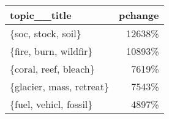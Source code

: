 \begin{tabular}{p{2cm}r}
\toprule
             topic\_\_title &  pchange \\
\midrule
       \{soc, stock, soil\} &   12638\% \\
    \{fire, burn, wildfir\} &   10893\% \\
    \{coral, reef, bleach\} &    7619\% \\
 \{glacier, mass, retreat\} &    7543\% \\
   \{fuel, vehicl, fossil\} &    4897\% \\
\bottomrule
\end{tabular}
